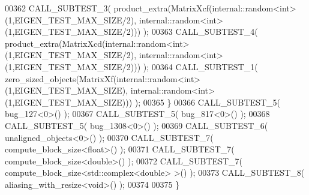 \begin{DoxyCode}
00362     CALL\_SUBTEST\_3( product\_extra(MatrixXcf(internal::random<int>(1,EIGEN\_TEST\_MAX\_SIZE/2), 
      internal::random<int>(1,EIGEN\_TEST\_MAX\_SIZE/2))) );
00363     CALL\_SUBTEST\_4( product\_extra(MatrixXcd(internal::random<int>(1,EIGEN\_TEST\_MAX\_SIZE/2), 
      internal::random<int>(1,EIGEN\_TEST\_MAX\_SIZE/2))) );
00364     CALL\_SUBTEST\_1( zero\_sized\_objects(MatrixXf(internal::random<int>(1,EIGEN\_TEST\_MAX\_SIZE), 
      internal::random<int>(1,EIGEN\_TEST\_MAX\_SIZE))) );
00365   \}
00366   CALL\_SUBTEST\_5( bug\_127<0>() );
00367   CALL\_SUBTEST\_5( bug\_817<0>() );
00368   CALL\_SUBTEST\_5( bug\_1308<0>() );
00369   CALL\_SUBTEST\_6( unaligned\_objects<0>() );
00370   CALL\_SUBTEST\_7( compute\_block\_size<float>() );
00371   CALL\_SUBTEST\_7( compute\_block\_size<double>() );
00372   CALL\_SUBTEST\_7( compute\_block\_size<std::complex<double> >() );
00373   CALL\_SUBTEST\_8( aliasing\_with\_resize<void>() );
00374 
00375 \}
\end{DoxyCode}
